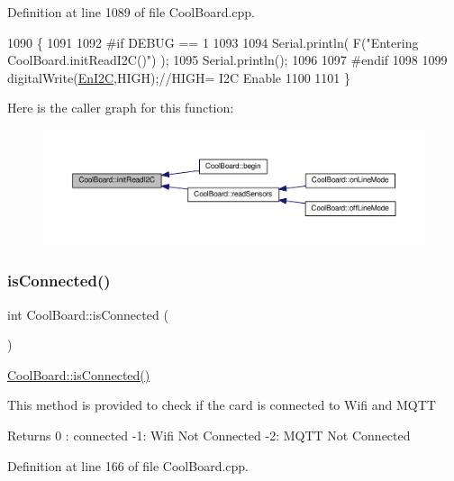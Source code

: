 Definition at line 1089 of file Cool\+Board.\+cpp.


\begin{DoxyCode}
1090 \{
1091 
1092 \textcolor{preprocessor}{#if DEBUG == 1}
1093 
1094     Serial.println( F(\textcolor{stringliteral}{"Entering CoolBoard.initReadI2C()"}) );
1095     Serial.println();
1096 
1097 \textcolor{preprocessor}{#endif}
1098  
1099     digitalWrite(\hyperlink{class_cool_board_af1fe1376fc66f93dee80b327ca695377}{EnI2C},HIGH);\textcolor{comment}{//HIGH= I2C Enable}
1100 
1101 \}
\end{DoxyCode}
Here is the caller graph for this function\+:\nopagebreak
\begin{figure}[H]
\begin{center}
\leavevmode
\includegraphics[width=350pt]{d7/df9/class_cool_board_a397b46fadab8f530a8cf4d914c561366_icgraph}
\end{center}
\end{figure}
\mbox{\label{class_cool_board_ad7442cf4b62c7b0d5bd62a0f75ffc065}} 
\subsubsection{\texorpdfstring{is\+Connected()}{isConnected()}}
{\footnotesize\ttfamily int Cool\+Board\+::is\+Connected (\begin{DoxyParamCaption}{ }\end{DoxyParamCaption})}

\hyperlink{class_cool_board_ad7442cf4b62c7b0d5bd62a0f75ffc065}{Cool\+Board\+::is\+Connected()}

This method is provided to check if the card is connected to Wifi and M\+Q\+TT

\begin{DoxyReturn}{Returns}
0 \+: connected -\/1\+: Wifi Not Connected -\/2\+: M\+Q\+TT Not Connected 
\end{DoxyReturn}


Definition at line 166 of file Cool\+Board.\+cpp.


